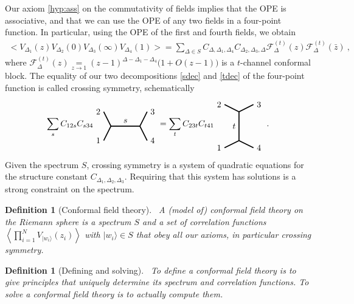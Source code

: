 \documentclass[12pt, a4paper]{article}
\theoremstyle{break}
\newtheorem{defn}[exo]{Definition}
\begin{document}
Our axiom \ref{hyp:ass} on the commutativity of fields implies that the OPE is associative, and that we can use the OPE of any two fields in a four-point function. In particular, using the OPE of the first and fourth fields, we obtain 
\begin{align}
 \Big<V_{\Delta_1}(z)V_{\Delta_2}(0)V_{\Delta_3}(\infty)V_{\Delta_4}(1)\Big>
 =\sum_{\Delta\in S} C_{\Delta,\Delta_1,\Delta_4} C_{\Delta_2,\Delta_3,\Delta}   \mathcal{F}^{(t)}_\Delta(z) \mathcal{F}^{(t)}_\Delta(\bar z)\ ,
 \label{tdec}
\end{align}
where $\mathcal{F}^{(t)}_\Delta(z) \underset{z\to 1}{=} (z-1)^{\Delta-\Delta_1-\Delta_4}\Big(1+O(z-1)\Big)$ is a $t$-channel conformal block.
The equality of our two decompositions \eqref{sdec} and \eqref{tdec} of the four-point function is called crossing symmetry, schematically 
\begin{align}
 \sum_{s} C_{12s} C_{s34} 
 \begin{tikzpicture}[baseline=(current  bounding  box.center), very thick, scale = .3]
\draw (-1,2) node [left] {$2$} -- (0,0) -- node [above] {$s$} (4,0) -- (5,2) node [right] {$3$};
\draw (-1,-2) node [left] {$1$} -- (0,0);
\draw (4,0) -- (5,-2) node [right] {$4$};
\end{tikzpicture} 
= \sum_{t} C_{23t}C_{t41} 
\begin{tikzpicture}[baseline=(current  bounding  box.center), very thick, scale = .3]
 \draw (-2,3) node [left] {$2$} -- (0,2) -- node [left] {$t$} (0,-2) -- (-2, -3) node [left] {$1$};
\draw (0,2) -- (2,3) node [right] {$3$};
\draw (0,-2) -- (2, -3) node [right] {$4$};
\end{tikzpicture}
\ .
\label{csd}
\end{align}
Given the spectrum $S$, crossing symmetry is a system of quadratic equations for the structure constant $C_{\Delta_1,\Delta_2,\Delta_3}$. Requiring that this system has solutions is a strong constraint on the spectrum. 

\begin{defn}[Conformal field theory]
~\label{def:cft}
A (model of) conformal field theory on the Riemann sphere is a spectrum $S$ and a set of correlation functions $\left<\prod_{i=1}^N V_{|w_i\rangle}(z_i)\right>$ with $|w_i\rangle\in S$ that obey all our axioms, in particular crossing symmetry. 
\end{defn}

\begin{defn}[Defining and solving]
 ~\label{def:def}
 To define a conformal field theory is to give principles that uniquely determine its spectrum and correlation functions.
 To solve a conformal field theory is to actually compute them.
\end{defn}
\end{document}

